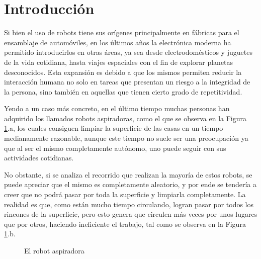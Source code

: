\section{Introducción}
\label{sec:2_marcoteorico}
Si bien el uso de robots tiene sus orígenes principalmente en fábricas para el ensamblaje de automóviles, en los últimos años la electrónica moderna ha permitido introducirlos en otras áreas, ya sea desde electrodomésticos y juguetes de la vida cotidiana, hasta viajes espaciales con el fin de explorar planetas desconocidos. Esta expansión es debido a que los mismos permiten reducir la interacción humana no solo en tareas que presentan un riesgo a la integridad de la persona, sino también en aquellas que tienen cierto grado de repetitividad.

Yendo a un caso más concreto, en el último tiempo muchas personas han adquirido los llamados robots aspiradoras, como el que se observa en la Figura \ref{fig:vaccumrobot}.a, los cuales consiguen limpiar la superficie de las casas en un tiempo medianamente razonable, aunque este tiempo no suele ser una preocupación ya que al ser el mismo completamente autónomo, uno puede seguir con sus actividades cotidianas. 

No obstante, si se analiza el recorrido que realizan la mayoría de estos robots, se puede apreciar que el mismo es completamente aleatorio, y por ende se tendería a creer que no podrá pasar por toda la superficie y limpiarla completamente. La realidad es que, como están mucho tiempo circulando, logran pasar por todos los rincones de la superficie, pero esto genera que circulen más veces por unos lugares que por otros, haciendo ineficiente el trabajo, tal como se observa en la Figura \ref{fig:vaccumrobot}.b.

\begin{figure}[!ht]
    \centering
    \qquad
    \caption{El robot aspiradora}
    \label{fig:vaccumrobot}
\end{figure}

